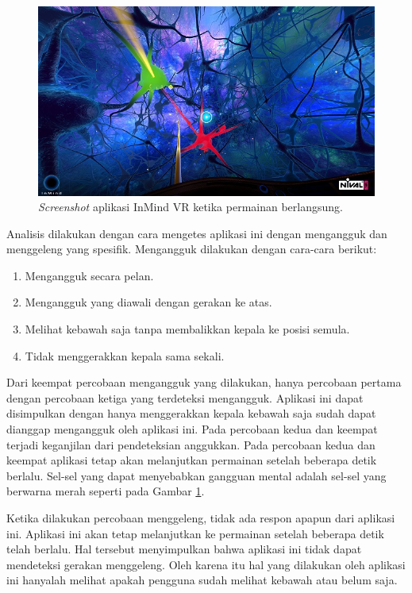\documentclass[a4paper,twoside]{article}
\begin{document}
\begin{enumerate}
\begin{figure}[H]
\centering
\includegraphics[scale=0.7]{Gambar/screenshot-inmind-gameplay.jpg}
\caption{\textit{Screenshot} aplikasi InMind VR ketika permainan berlangsung.}
\label{fig:screenshot_inmind_gameplay}
\end{figure}

Analisis dilakukan dengan cara mengetes aplikasi ini dengan mengangguk dan menggeleng yang spesifik. Mengangguk dilakukan dengan cara-cara berikut:
\begin{enumerate}
	\item Mengangguk secara pelan.
	\item Mengangguk yang diawali dengan gerakan ke atas.
	\item Melihat kebawah saja tanpa membalikkan kepala ke posisi semula.
	\item Tidak menggerakkan kepala sama sekali.
\end{enumerate}

Dari keempat percobaan mengangguk yang dilakukan, hanya percobaan pertama dengan percobaan ketiga yang terdeteksi mengangguk. Aplikasi ini dapat disimpulkan dengan hanya menggerakkan kepala kebawah saja sudah dapat dianggap mengangguk oleh aplikasi ini. Pada percobaan kedua dan keempat terjadi keganjilan dari pendeteksian anggukkan. Pada percobaan kedua dan keempat aplikasi tetap akan melanjutkan permainan setelah beberapa detik berlalu. Sel-sel yang dapat menyebabkan gangguan mental adalah sel-sel yang berwarna merah seperti pada Gambar \ref{fig:screenshot_inmind_gameplay}. 

Ketika dilakukan percobaan menggeleng, tidak ada respon apapun dari aplikasi ini. Aplikasi ini akan tetap melanjutkan ke permainan setelah beberapa detik telah berlalu. Hal tersebut menyimpulkan bahwa aplikasi ini tidak dapat mendeteksi gerakan menggeleng. Oleh karena itu hal yang dilakukan oleh aplikasi ini hanyalah melihat apakah pengguna sudah melihat kebawah atau belum saja.


\end{enumerate}
\end{document}
